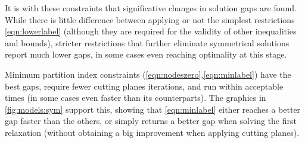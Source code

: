 It is with these constraints that significative changes in solution gaps are found. While there is little difference between applying or not the simplest restrictions \ref{eqn:lowerlabel} (although they are required for the validity of other inequalities and bounds), stricter restrictions that further eliminate symmetrical solutions report much lower gaps, in some cases even reaching optimality at this stage. 

Minimum partition index constraints (\ref{eqn:nodeszero},\ref{eqn:minlabel}) have the best gaps, require fewer cutting planes iterations, and run within acceptable times (in some cases even faster than its counterparts). The graphics in \ref{fig:models:sym} support this, showing that \ref{eqn:minlabel} either reaches a better gap faster than the others, or simply returns a better gap when solving the first relaxation (without obtaining a big improvement when applying cutting planes).


